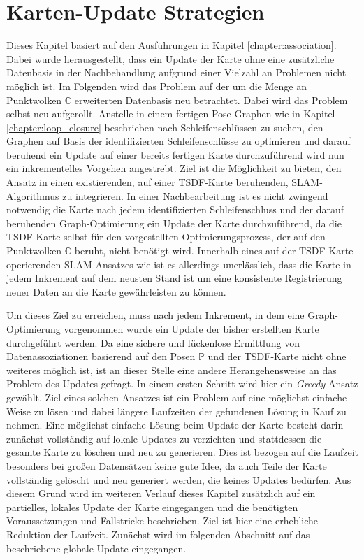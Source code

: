 \chapter{Karten-Update Strategien}
\label{chapter:map_update}

Dieses Kapitel basiert auf den Ausführungen in Kapitel \ref{chapter:association}. Dabei wurde herausgestellt, dass ein Update der Karte ohne eine zusätzliche Datenbasis in der Nachbehandlung aufgrund einer Vielzahl an Problemen nicht möglich ist. Im Folgenden wird das Problem auf der um die Menge an Punktwolken $\mathbb{C}$ erweiterten Datenbasis neu betrachtet. Dabei wird das Problem selbst neu aufgerollt. Anstelle in einem fertigen Pose-Graphen wie in Kapitel \ref{chapter:loop_closure} beschrieben nach Schleifenschlüssen zu suchen, den Graphen auf Basis der identifizierten Schleifenschlüsse zu optimieren und darauf beruhend ein Update auf einer bereits fertigen Karte durchzuführend wird nun ein inkrementelles Vorgehen angestrebt. Ziel ist die Möglichkeit zu bieten, den Ansatz in einen existierenden, auf einer TSDF-Karte beruhenden, SLAM-Algorithmus zu integrieren. In einer Nachbearbeitung ist es nicht zwingend notwendig die Karte nach jedem identifizierten Schleifenschluss und der darauf beruhenden Graph-Optimierung ein Update der Karte durchzuführend, da die TSDF-Karte selbst für den vorgestellten Optimierungsprozess, der auf den Punktwolken $\mathbb{C}$ beruht, nicht benötigt wird. Innerhalb eines auf der TSDF-Karte operierenden SLAM-Ansatzes wie \cite{HATSDF} ist es allerdings unerlässlich, dass die Karte in jedem Inkrement auf dem neusten Stand ist um eine konsistente Registrierung neuer Daten an die Karte gewährleisten zu können.

Um dieses Ziel zu erreichen, muss nach jedem Inkrement, in dem eine Graph-Optimierung vorgenommen wurde ein Update der bisher erstellten Karte durchgeführt werden. Da eine sichere und lückenlose Ermittlung von Datenassoziationen basierend auf den Posen $\mathbb{P}$ und der TSDF-Karte nicht ohne weiteres möglich ist, ist an dieser Stelle eine andere Herangehensweise an das Problem des Updates gefragt. In einem ersten Schritt wird hier ein \emph{Greedy}-Ansatz gewählt. Ziel eines solchen Ansatzes ist ein Problem auf eine möglichst einfache Weise zu lösen und dabei längere Laufzeiten der gefundenen Lösung in Kauf zu nehmen. Eine möglichst einfache Lösung beim Update der Karte besteht darin zunächst vollständig auf lokale Updates zu verzichten und stattdessen die gesamte Karte zu löschen und neu zu generieren. Dies ist bezogen auf die Laufzeit besonders bei großen Datensätzen keine gute Idee, da auch Teile der Karte vollständig gelöscht und neu generiert werden, die keines Updates bedürfen. Aus diesem Grund wird im weiteren Verlauf dieses Kapitel zusätzlich auf ein partielles, lokales Update der Karte eingegangen und die benötigten Voraussetzungen und Fallstricke beschrieben. Ziel ist hier eine erhebliche Reduktion der Laufzeit. Zunächst wird im folgenden Abschnitt auf das beschriebene globale Update eingegangen.

